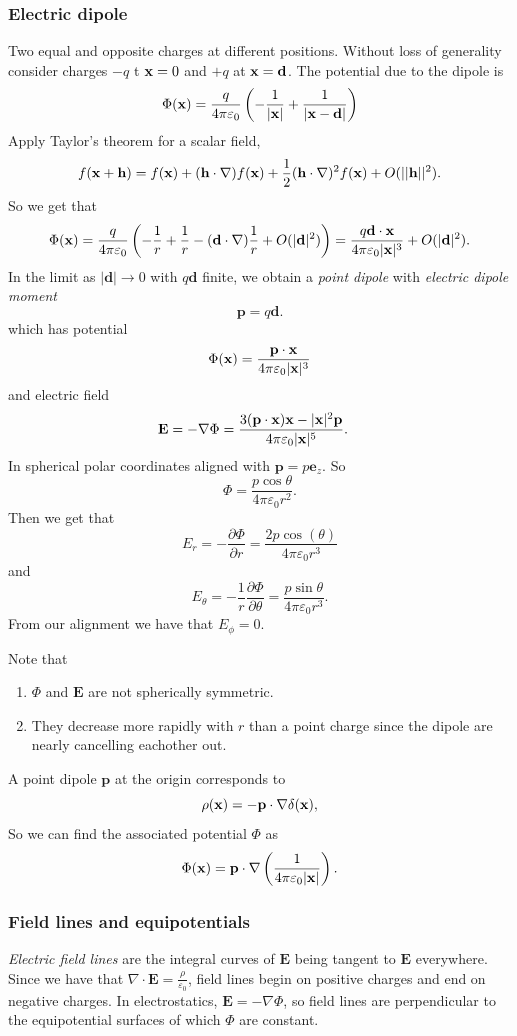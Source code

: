 \documentclass{article}
\begin{document}
\subsubsection{Electric dipole}
Two equal and opposite charges at different positions. Without loss of generality consider charges $ -q $ t $ \mathbf{x}= 0 $ and $ +q $ at $ \mathbf{x} = \mathbf d $. The potential due to the dipole is
\[
	\Phi(\mathbf{x}) = \frac q{4\pi \varepsilon_0}\left(-\frac 1{|\mathbf{x}|} + \frac 1{|\mathbf{x}-\mathbf d|}\right)
\]
Apply Taylor's theorem for a scalar field,
\[
  f(\mathbf{x}+\mathbf h) = f(\mathbf{x}) + (\mathbf h \cdot\nabla)f(\mathbf{x}) + \frac 12 (\mathbf h \cdot \nabla)^2 f(\mathbf{x}) + O(||\mathbf h ||^2).
\]
So we get that
\[
	\Phi(\mathbf{x}) = \frac q{4\pi \varepsilon_0} \left(-\frac 1r + \frac 1r -(\mathbf d \cdot \nabla)\frac 1r + O(|\mathbf d |^2)\right) = \frac{q\mathbf d\cdot\mathbf x}{4\pi\varepsilon_0 |\mathbf{x}|^3}+O(|\mathbf d|^2).
\]
In the limit as $ |\mathbf d| \to 0 $ with $ q\mathbf d $ finite, we obtain a \textit{point dipole} with \textit{electric dipole moment}
\[
  \mathbf p =q\mathbf d.
\]
which has potential
\[
	\Phi(\mathbf{x}) = \frac{\mathbf p \cdot \mathbf{x}}{4\pi \varepsilon_0 |\mathbf{x}|^3}
\]
and electric field
\begin{align*}
	\mathbf E = -\nabla\Phi &= \frac {3(\mathbf p \cdot \mathbf{x})\mathbf{x}-|\mathbf{x}|^2 \mathbf p}{4\pi\varepsilon_0 |\mathbf{x}|^5}.
\end{align*}
In spherical polar coordinates aligned with $ \mathbf p  = p\mathbf e_z $. So
\[
	\Phi = \frac {p\cos\theta}{4\pi\varepsilon_0 r^2}.
\]
Then we get that
\[
	E_r = -\frac{\partial \Phi}{\partial r} = \frac  {2p\cos(\theta)}{4\pi\varepsilon_0 r^3}
\]
and
\[
	E_\theta = -\frac 1r \frac{\partial \Phi}{\partial \theta} = \frac{p\sin\theta}{4\pi\varepsilon_0 r^3}.
\]
From our alignment we have that $ E_\phi = 0 $.
\begin{remark}
  Note that
  \begin{enumerate}
	  \item $ \Phi $ and $ \mathbf E $ are not spherically symmetric.
	  \item They decrease more rapidly with $ r $ than a point charge since the dipole are nearly cancelling eachother out.
  \end{enumerate}
\end{remark}
A point dipole $ \mathbf p  $ at the origin corresponds to
\[
  \rho(\mathbf{x}) = -\mathbf p \cdot \nabla \delta(\mathbf{x}),
\]
So we can find the associated potential $ \Phi $ as
\[
	\Phi(\mathbf{x}) = \mathbf p \cdot\nabla\left(\frac1{4\pi\varepsilon_0 |\mathbf{x}|}\right).
\]
\subsubsection{Field lines and equipotentials}
\textit{Electric field lines} are the integral curves of $ \mathbf E $ being tangent to $ \mathbf E $ everywhere. Since we have that $ \nabla\cdot \mathbf E = \frac \rho{\varepsilon_0} $, field lines begin on positive charges and end on negative charges. In electrostatics, $ \mathbf E = -\nabla\Phi $, so field lines are perpendicular to the equipotential surfaces of which $ \Phi $ are constant.
\end{document}
